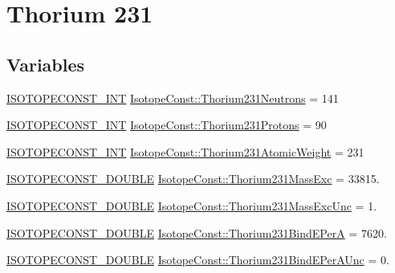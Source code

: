 \hypertarget{group___isotope_const-_thorium-_th231}{}\section{Thorium 231}
\label{group___isotope_const-_thorium-_th231}
\subsection*{Variables}
\begin{DoxyCompactItemize}
\item 
\mbox{\hyperlink{group___isotope_const-_macros_ga5f18360b3e99483a35c32d789e62621c}{I\+S\+O\+T\+O\+P\+E\+C\+O\+N\+S\+T\+\_\+\+I\+NT}} \mbox{\hyperlink{group___isotope_const-_thorium-_th231_gaee6d9c02dd0d398b339b70b1283f60be}{Isotope\+Const\+::\+Thorium231\+Neutrons}} = 141
\item 
\mbox{\hyperlink{group___isotope_const-_macros_ga5f18360b3e99483a35c32d789e62621c}{I\+S\+O\+T\+O\+P\+E\+C\+O\+N\+S\+T\+\_\+\+I\+NT}} \mbox{\hyperlink{group___isotope_const-_thorium-_th231_ga24f8ac770b5190103d35a646d0631648}{Isotope\+Const\+::\+Thorium231\+Protons}} = 90
\item 
\mbox{\hyperlink{group___isotope_const-_macros_ga5f18360b3e99483a35c32d789e62621c}{I\+S\+O\+T\+O\+P\+E\+C\+O\+N\+S\+T\+\_\+\+I\+NT}} \mbox{\hyperlink{group___isotope_const-_thorium-_th231_ga3e005eec631edddf10de5ca5aa36c87d}{Isotope\+Const\+::\+Thorium231\+Atomic\+Weight}} = 231
\item 
\mbox{\hyperlink{group___isotope_const-_macros_ga8f45a7272ce02c0b4c65c44636ed719a}{I\+S\+O\+T\+O\+P\+E\+C\+O\+N\+S\+T\+\_\+\+D\+O\+U\+B\+LE}} \mbox{\hyperlink{group___isotope_const-_thorium-_th231_ga07a976476596d550dbf3a9025a899ed3}{Isotope\+Const\+::\+Thorium231\+Mass\+Exc}} = 33815.
\item 
\mbox{\hyperlink{group___isotope_const-_macros_ga8f45a7272ce02c0b4c65c44636ed719a}{I\+S\+O\+T\+O\+P\+E\+C\+O\+N\+S\+T\+\_\+\+D\+O\+U\+B\+LE}} \mbox{\hyperlink{group___isotope_const-_thorium-_th231_ga6b6125575f15f2ef3fecdc0529f7b63a}{Isotope\+Const\+::\+Thorium231\+Mass\+Exc\+Unc}} = 1.
\item 
\mbox{\hyperlink{group___isotope_const-_macros_ga8f45a7272ce02c0b4c65c44636ed719a}{I\+S\+O\+T\+O\+P\+E\+C\+O\+N\+S\+T\+\_\+\+D\+O\+U\+B\+LE}} \mbox{\hyperlink{group___isotope_const-_thorium-_th231_ga0e82fbff78257a68616f2c297c65f979}{Isotope\+Const\+::\+Thorium231\+Bind\+E\+PerA}} = 7620.
\item 
\mbox{\hyperlink{group___isotope_const-_macros_ga8f45a7272ce02c0b4c65c44636ed719a}{I\+S\+O\+T\+O\+P\+E\+C\+O\+N\+S\+T\+\_\+\+D\+O\+U\+B\+LE}} \mbox{\hyperlink{group___isotope_const-_thorium-_th231_ga2fa9ca5ec14a434046a2f622f92c979c}{Isotope\+Const\+::\+Thorium231\+Bind\+E\+Per\+A\+Unc}} = 0.

\end{DoxyCompactItemize}
